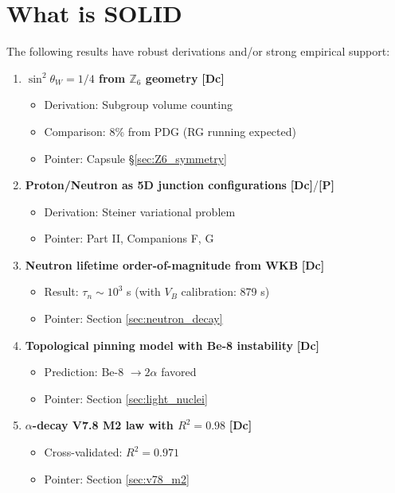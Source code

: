\documentclass[11pt,a4paper]{article}
\newcommand{\tagP}{\textcolor{red!70!black}{\textbf{[P]}}}
\newcommand{\tagDc}{\textcolor{blue!70!black}{\textbf{[Dc]}}}
\begin{document}
\section{What is SOLID}
\label{sec:what_solid}

The following results have robust derivations and/or strong empirical support:

\begin{enumerate}
    \item \textbf{$\sin^2\theta_W = 1/4$ from $\mathbb{Z}_6$ geometry} \tagDc{}
    \begin{itemize}[nosep]
        \item Derivation: Subgroup volume counting
        \item Comparison: 8\% from PDG (RG running expected)
        \item Pointer: Capsule §\ref{sec:Z6_symmetry}
    \end{itemize}

    \item \textbf{Proton/Neutron as 5D junction configurations} \tagDc{}/\tagP{}
    \begin{itemize}[nosep]
        \item Derivation: Steiner variational problem
        \item Pointer: Part II, Companions F, G
    \end{itemize}

    \item \textbf{Neutron lifetime order-of-magnitude from WKB} \tagDc{}
    \begin{itemize}[nosep]
        \item Result: $\tau_n \sim 10^3$ s (with $V_B$ calibration: 879 s)
        \item Pointer: Section \ref{sec:neutron_decay}
    \end{itemize}

    \item \textbf{Topological pinning model with Be-8 instability} \tagDc{}
    \begin{itemize}[nosep]
        \item Prediction: Be-8 $\to 2\alpha$ favored
        \item Pointer: Section \ref{sec:light_nuclei}
    \end{itemize}

    \item \textbf{$\alpha$-decay V7.8 M2 law with $R^2 = 0.98$} \tagDc{}
    \begin{itemize}[nosep]
        \item Cross-validated: $R^2 = 0.971$
        \item Pointer: Section \ref{sec:v78_m2}
    \end{itemize}


\end{enumerate}
\end{document}
